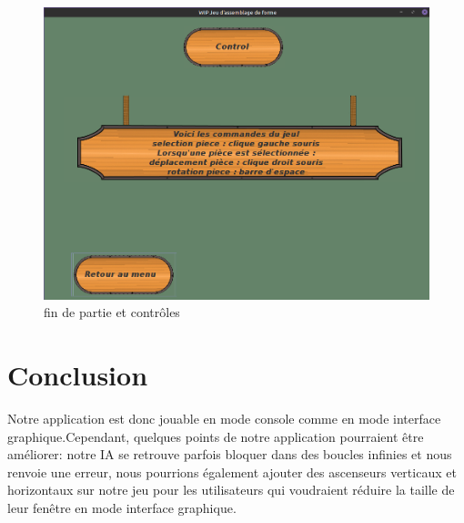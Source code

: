 \documentclass[12pt]{article}
\begin{document}
\begin{figure}[h]
\begin{center}
\includegraphics[scale=0.125]{Images/Control.png}
\end{center}
\caption{fin de partie et contrôles}

\end{figure}


\section*{Conclusion}
\begin{small}
Notre application est donc jouable en mode console comme en mode interface graphique.Cependant, quelques points de notre application pourraient être améliorer: notre IA se retrouve parfois bloquer dans des boucles infinies et nous renvoie une erreur, nous pourrions également ajouter des ascenseurs verticaux et horizontaux sur notre jeu pour les utilisateurs qui voudraient réduire la taille de leur fenêtre en mode  interface graphique.
\end{small}
\end{document}
